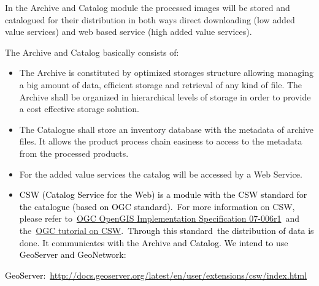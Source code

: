 \documentclass[a4paper]{article}
\newcommand\liststyleLFOxxxi{%
\renewcommand\labelitemi{[F0B7?]}
\renewcommand\labelitemii{o}
\renewcommand\labelitemiii{[F0A7?]}
\renewcommand\labelitemiv{[F0B7?]}
}
\begin{document}
In the Archive and Catalog module the processed images will be stored
and catalogued for their distribution in both ways direct downloading
(low added value services) and web based service (high added value
services).


\bigskip

{\color{black}
The Archive and Catalog basically consists of:}


\bigskip

\liststyleLFOxxxi
\begin{itemize}
\item {\color{black}
The Archive is constituted by optimized storages structure allowing
managing a big amount of data, efficient storage and retrieval of any
kind of file. The Archive shall be organized in hierarchical levels of
storage in order to provide a cost effective storage solution.}
\end{itemize}

\bigskip

\liststyleLFOxxxi
\begin{itemize}
\item {\color{black}
The Catalogue shall store an inventory database with the metadata of
archive files. It allows the product process chain easiness to access
to the metadata from the processed products.}
\end{itemize}

\bigskip

\liststyleLFOxxxi
\begin{itemize}
\item {\color{black}
For the added value services the catalog will be accessed by a Web
Service.}
\end{itemize}

\bigskip

\liststyleLFOxxxi
\begin{itemize}
\item \textcolor{black}{CSW (Catalog Service for the Web) is a module
with the CSW standard for the catalogue (based on OGC
standard).}\textcolor[rgb]{0.14901961,0.14509805,0.13725491}{\ For more
information on CSW, please refer
to}\textcolor[rgb]{0.14901961,0.14509805,0.13725491}{~}\href{http://www.opengeospatial.org/standards/specifications/catalog}{\textcolor[rgb]{0.0,0.4627451,0.6313726}{OGC
OpenGIS Implementation Specification
07-006r1}}\textcolor[rgb]{0.14901961,0.14509805,0.13725491}{~}\textcolor[rgb]{0.14901961,0.14509805,0.13725491}{and
the\ }\href{http://www.ogcnetwork.net/node/630}{\textcolor[rgb]{0.0,0.4627451,0.6313726}{OGC
tutorial on
CSW}}\textcolor[rgb]{0.14901961,0.14509805,0.13725491}{.}\textcolor{black}{\ Through
this standard\ }\textcolor{black}{the distribution of data is done. It
communicates with the Archive and Catalog. We intend to use GeoServer
and GeoNetwork:}
\end{itemize}
\textcolor{black}{GeoServer:\ }\url{http://docs.geoserver.org/latest/en/user/extensions/csw/index.html}
\end{document}
